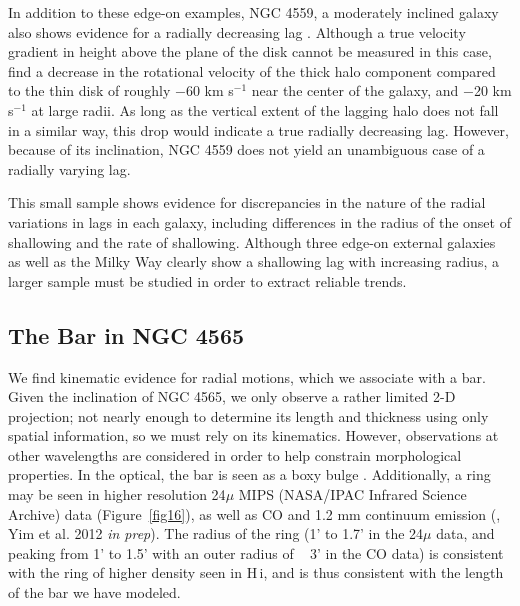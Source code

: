 \documentclass{emulateapj}
\begin{document}
\par
    In addition to these edge-on examples, NGC 4559, a moderately inclined galaxy also shows evidence for a radially decreasing lag \citep{2005A&A...439..947B}.  Although a true velocity gradient in height above the plane of the disk cannot be measured in this case, \citet{2005A&A...439..947B} find a decrease in the rotational velocity of the thick halo component compared to the thin disk of roughly $-$60 km s$^{-1}$ near the center of the galaxy, and $-$20 km s$^{-1}$ at large radii.  As long as the vertical extent of the lagging halo does not fall in a similar way, this drop would indicate a true radially decreasing lag. However, because of its inclination, NGC 4559 does not yield an unambiguous case of a radially varying lag.    
 
\par
     This small sample shows evidence for discrepancies in the nature of the radial variations in lags in each galaxy, including differences in the radius of the onset of shallowing and the rate of shallowing.  Although three edge-on external galaxies as well as the Milky Way clearly show a shallowing lag with increasing radius, a larger sample must be studied in order to extract reliable trends.
   

\subsection{The Bar in NGC 4565} \label{Section6.5}

\par
     We find kinematic evidence for radial motions, which we associate with a bar.  Given the inclination of NGC 4565, we only observe a rather limited 2-D projection; not nearly enough to determine its length and thickness using only spatial information, so we must rely on its kinematics.  However, observations at other wavelengths are considered in order to help constrain morphological properties.  In the optical, the bar is seen as a boxy bulge \citep{2010ApJ...715L.176K}.  Additionally, a ring may be seen in higher resolution 24$\mu$ MIPS (NASA/IPAC Infrared Science Archive) data (Figure~\ref{fig16}), as well as CO and 1.2 mm continuum emission (\citealt{1996A&A...310..725N}, Yim et al. 2012 \textit{in prep}).  The radius of the ring (1' to 1.7' in the 24$\mu$ data, and peaking from 1' to 1.5' with an outer radius of ~ 3' in the CO data) is consistent with the ring of higher density seen in {\sc H\,i}, and is thus consistent with the length of the bar we have modeled. 
\end{document}
